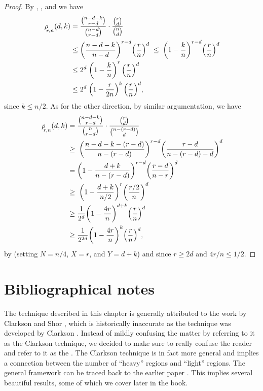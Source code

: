 \begin{proof}
    By , , and
     we have
    \begin{align*}
        \CSProbFull{r}{d}{k}{n}%
      & =%
        \frac{\binom{n-d-k}{r-d}} {\binom{n-d}{r-d}} \cdot
        \frac{\binom{r}{d}} {\binom{n}{d}}%
        \\
        &\leq%
        \pth{ \frac{n-d-k}{n-d} }^{r-d} \pth{\frac{r}{n}}^d \;\leq\;
        \pth{ 1 - \frac{k}{n} }^{r-d} \pth{\frac{r}{n}}^d
        \\
        & \leq 2^{d}
        \; \pth{ 1 - \frac{k}{n} }^{r} \,\pth{\frac{r}{n}}^d
        \\
        & \leq 2^{d} \; \pth{ 1 - \frac{r}{2 n} }^{k}
        \,\pth{\frac{r}{n}}^d,
    \end{align*}
    since $k \leq n/2$. As for the other direction, by similar
    argumentation, we have
    \begin{align*}
        \CSProbFull{r}{d}{k}{n}%
        &=%
        \frac{\binom{n-d-k}{r-d}}{\binom{n}{r-d}} \cdot
        \frac{\binom{r}{d}}{\binom{n-(r-d)}{d}}%
        \\
        &\geq\;
        \pth{ \frac{n - d-k - (r-d)}{n-(r-d)} }^{r-d}
        \pth{\frac{r-d}{n-(r-d)-d}}^d\\
        & =%
        \pth{ 1 - \frac{d+k}{n-(r-d)} }^{r-d}
        \pth{\frac{r-d}{n-r}}^d
        \\
        & \geq\; \pth{ 1 - \frac{d+k}{n/2}
        }^{r} \pth{\frac{r/2}{n}}^d
        \\%
        & \geq%
        \frac{1}{2^d} \pth{ 1 - \frac{4 r}{n} }^{d+k}
        \pth{\frac{r}{n}}^d
        \\
        & \geq%
        \frac{1}{2^{2d}} \pth{ 1 - \frac{4 r}{n} }^{k}
        \pth{\frac{r}{n}}^d,
    \end{align*}
    by  (setting $N=n/4$, $X=r$, and $Y=d+k$)
    and since $r \geq 2d$ and $4r/n \leq 1/2$.
\end{proof}




\section{Bibliographical notes}

The technique described in this chapter is generally attributed to the
work by Clarkson and Shor \cite{cs-arscg-89}, which is historically
inaccurate as the technique was developed by Clarkson
\cite{c-arscg-88}. Instead of mildly confusing the matter by referring
to it as the Clarkson technique, we decided to make sure to really
confuse the reader and refer to it as the . The Clarkson technique \cite{c-arscg-88} is in fact
more general and implies a connection between the number of ``heavy''
regions and ``light'' regions. The general framework can be traced
back to the earlier paper \cite{c-narsc-87}. This implies several
beautiful results, some of which we cover later in the book.

